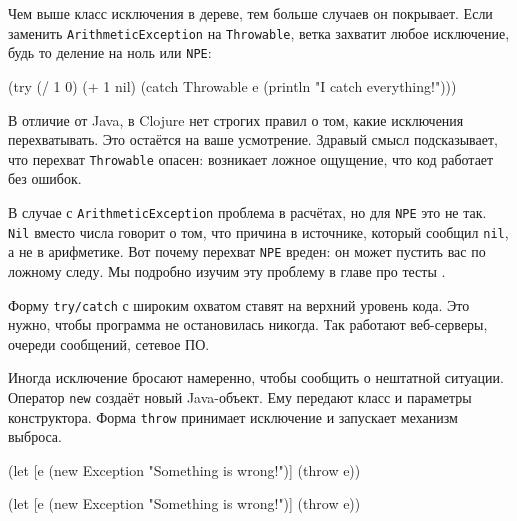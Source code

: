 
Чем выше класс исключения в дереве, тем больше случаев он покрывает. Если
заменить \verb|ArithmeticException| на \verb|Throwable|, ветка захватит
любое исключение, будь то деление на ноль или \verb|NPE|:

\begin{english}
  \begin{clojure}
(try
  (/ 1 0)
  (+ 1 nil)
  (catch Throwable e
    (println "I catch everything!")))
  \end{clojure}
\end{english}

В отличие от Java, в Clojure нет строгих правил о том, какие исключения
перехватывать. Это остаётся на ваше усмотрение. Здравый смысл подсказывает, что
перехват \verb|Throwable| опасен: возникает ложное ощущение, что код работает
без ошибок.

В случае с \verb|ArithmeticException| проблема в расчётах, но для \verb|NPE| это
не так. \verb|Nil| вместо числа говорит о том, что причина в источнике, который
сообщил \verb|nil|, а не в арифметике. Вот почему перехват \verb|NPE| вреден: он
может пустить вас по ложному следу. Мы подробно изучим эту проблему в главе про
тесты .

Форму \verb|try/catch| с широким охватом ставят на верхний уровень кода. Это
нужно, чтобы программа не остановилась никогда. Так работают веб-серверы,
очереди сообщений, сетевое ПО.


Иногда исключение бросают намеренно, чтобы сообщить о нештатной
ситуации. Оператор \verb|new| создаёт новый Java-объект. Ему передают класс и
параметры конструктора. Форма \verb|throw| принимает исключение и запускает
механизм выброса.

\ifnarrow

\begin{english}
  \begin{clojure}
(let [e (new Exception
          "Something is wrong!")]
  (throw e))
  \end{clojure}
\end{english}

\else

\begin{english}
  \begin{clojure}
(let [e (new Exception "Something is wrong!")]
  (throw e))
  \end{clojure}
\end{english}

